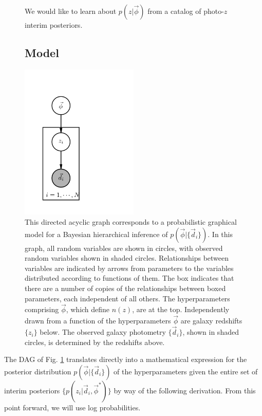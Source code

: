 \documentclass[iop]{emulateapj}
\begin{document}
\begin{figure}
	\begin{center}We would like to learn about $p(z | \vec{\phi})$ from a 
catalog of photo-$z$ interim posteriors.
		
		\subsection{Model}
		\label{sec:model}
		
		\includegraphics[width=0.5\textwidth]{fig/pgm.png}
		\caption{This directed acyclic graph corresponds to a 
probabilistic graphical model for a Bayesian hierarchical inference of 
$p(\vec{\phi}|\{\vec{d}_{i}\})$.  In this graph, all random variables are shown 
in circles, with observed random variables shown in shaded circles.  
Relationships between variables are indicated by arrows from parameters to the 
variables distributed according to functions of them.  The box indicates that 
there are a number of copies of the relationships between boxed parameters, 
each independent of all others.  The hyperparameters comprising $\vec{\phi}$, 
which define $n(z)$, are at the top.  Independently drawn from a function of 
the hyperparameters $\vec{\phi}$ are galaxy redshifts $\{z_{i}\}$ below.  The 
observed galaxy photometry $\{\vec{d}_{i}\}$, shown in shaded circles, is 
determined by the redshifts above.}
	\label{fig:pgm}
	\end{center}
\end{figure}

The DAG of Fig. \ref{fig:pgm} translates directly into a mathematical 
expression for the posterior distribution $p(\vec{\phi} | \{\vec{d}_{i}\})$ of 
the hyperparameters given the entire set of interim posteriors $\{p(z_{i} | 
\vec{d}_{i}, \vec{\phi}^{*})\}$ by way of the following derivation.  From this 
point forward, we will use log probabilities.
\end{document}
